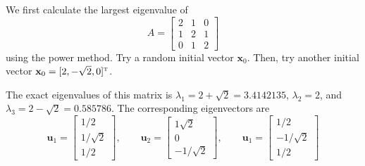 {\bigskip
\begin{samepage}
\begin{center}
\end{center}
\end{samepage}


\bigskip
\begin{example}\label{ex:eigen_power_large}

We first calculate the largest eigenvalue of 
\begin{equation}
A=
\begin{bmatrix}
2 & 1 & 0 \\ 1 & 2 & 1\\ 0 & 1 & 2
\end{bmatrix}
\end{equation}
using the power method.   Try a random initial vector $\mathbf{x}_0$.  Then, try another initial vector $\mathbf{x}_0 = [2, -\sqrt{2}, 0]^\textsc{t}$.

The exact eigenvalues of this matrix is $\lambda_1=2+\sqrt{2}=3.4142135$, $\lambda_2=2$, and $\lambda_3=2-\sqrt{2}=0.585786$. The corresponding eigenvectors are
\begin{equation}
\mathbf{u}_1 = \begin{bmatrix}
1/2 \\ 1/\sqrt{2} \\ 1/2
\end{bmatrix}, \qquad
\mathbf{u}_2 = \begin{bmatrix}
1\sqrt{2} \\ 0 \\ -1/\sqrt{2}
\end{bmatrix}, \qquad
\mathbf{u}_1 = \begin{bmatrix}
1/2 \\ -1/\sqrt{2} \\ 1/2
\end{bmatrix}
\end{equation}


\end{example}}
